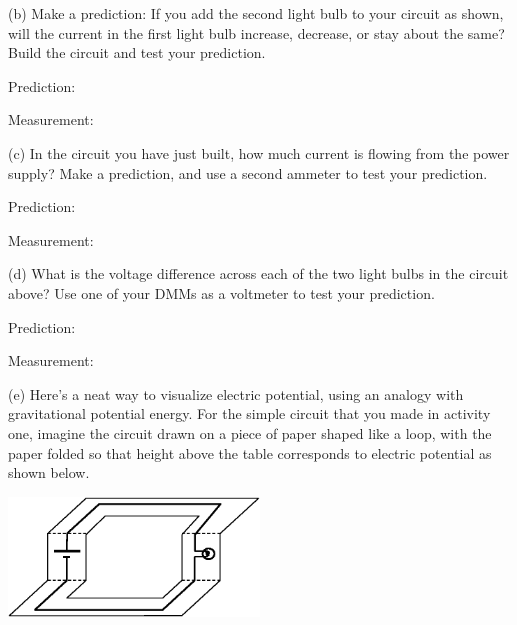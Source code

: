(b) Make a prediction: If you add the second light bulb to your circuit as shown, will the current in the first light bulb increase, decrease, or stay about the same?  Build the circuit and test your prediction. \par
\hspace{0.5 in} Prediction:   \par
\vspace{0.2 in}
\hspace{0.5 in} Measurement:  \par
\vspace{0.3 in}

(c)  In the circuit you have just built, how much current is flowing from the power supply?  Make a prediction, and use a second ammeter to test your prediction. \par
\hspace{0.5 in} Prediction:   \par
\vspace{0.2 in}
\hspace{0.5 in} Measurement:  \par
\vspace{0.3 in}

\begin{center}
 \par
\end{center}


(d) What is the voltage difference across each of the two light bulbs in the circuit above?  Use one of your DMMs as a voltmeter to test your prediction. \par
\hspace{0.5 in} Prediction:   \par
\vspace{0.2 in}
\hspace{0.5 in} Measurement:  \par
\vspace{0.3 in}

(e) Here's a neat way to visualize electric potential, using an analogy with gravitational potential energy.  For the simple circuit that you made in activity one, imagine the circuit drawn on a piece of paper shaped like a loop, with the paper folded so that height above the table corresponds to electric potential as shown below.
\begin{center}
\includegraphics[width=0.5\textwidth]{electric_circuits/how_to_fold.eps}
\end{center}
\vspace{-0.1in}

